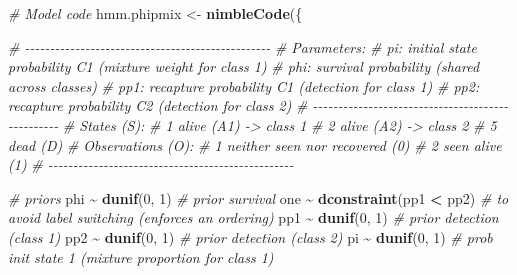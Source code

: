 \documentclass[
  12pt,
]{krantz}
\newenvironment{Shaded}{\begin{snugshade}}{\end{snugshade}}
\newcommand{\CommentTok}[1]{\textcolor[rgb]{0.56,0.35,0.01}{\textit{#1}}}
\newcommand{\DecValTok}[1]{\textcolor[rgb]{0.00,0.00,0.81}{#1}}
\newcommand{\FunctionTok}[1]{\textcolor[rgb]{0.13,0.29,0.53}{\textbf{#1}}}
\newcommand{\NormalTok}[1]{#1}
\newcommand{\OtherTok}[1]{\textcolor[rgb]{0.56,0.35,0.01}{#1}}
\newcommand{\SpecialCharTok}[1]{\textcolor[rgb]{0.81,0.36,0.00}{\textbf{#1}}}
\begin{document}
\begin{Shaded}
\begin{Highlighting}[]
\CommentTok{\# Model code}
\NormalTok{hmm.phipmix }\OtherTok{\textless{}{-}} \FunctionTok{nimbleCode}\NormalTok{(\{}
  
  \CommentTok{\# {-}{-}{-}{-}{-}{-}{-}{-}{-}{-}{-}{-}{-}{-}{-}{-}{-}{-}{-}{-}{-}{-}{-}{-}{-}{-}{-}{-}{-}{-}{-}{-}{-}{-}{-}{-}{-}{-}{-}{-}{-}{-}{-}{-}{-}{-}{-}{-}{-}}
  \CommentTok{\# Parameters:}
  \CommentTok{\# pi: initial state probability C1   (mixture weight for class 1)}
  \CommentTok{\# phi: survival probability          (shared across classes)}
  \CommentTok{\# pp1: recapture probability C1      (detection for class 1)}
  \CommentTok{\# pp2: recapture probability C2      (detection for class 2)}
  \CommentTok{\# {-}{-}{-}{-}{-}{-}{-}{-}{-}{-}{-}{-}{-}{-}{-}{-}{-}{-}{-}{-}{-}{-}{-}{-}{-}{-}{-}{-}{-}{-}{-}{-}{-}{-}{-}{-}{-}{-}{-}{-}{-}{-}{-}{-}{-}{-}{-}{-}{-}}
  \CommentTok{\# States (S):}
  \CommentTok{\# 1 alive (A1)  {-}\textgreater{} class 1}
  \CommentTok{\# 2 alive (A2)  {-}\textgreater{} class 2}
  \CommentTok{\# 5 dead (D)}
  \CommentTok{\# Observations (O):}
  \CommentTok{\# 1 neither seen nor recovered (0)}
  \CommentTok{\# 2 seen alive (1)}
  \CommentTok{\# {-}{-}{-}{-}{-}{-}{-}{-}{-}{-}{-}{-}{-}{-}{-}{-}{-}{-}{-}{-}{-}{-}{-}{-}{-}{-}{-}{-}{-}{-}{-}{-}{-}{-}{-}{-}{-}{-}{-}{-}{-}{-}{-}{-}{-}{-}{-}{-}{-}}
  
  \CommentTok{\# priors}
\NormalTok{  phi }\SpecialCharTok{\textasciitilde{}} \FunctionTok{dunif}\NormalTok{(}\DecValTok{0}\NormalTok{, }\DecValTok{1}\NormalTok{) }\CommentTok{\# prior survival}
\NormalTok{  one }\SpecialCharTok{\textasciitilde{}} \FunctionTok{dconstraint}\NormalTok{(pp1 }\SpecialCharTok{\textless{}}\NormalTok{ pp2) }\CommentTok{\# to avoid label switching (enforces an ordering)}
\NormalTok{  pp1 }\SpecialCharTok{\textasciitilde{}} \FunctionTok{dunif}\NormalTok{(}\DecValTok{0}\NormalTok{, }\DecValTok{1}\NormalTok{) }\CommentTok{\# prior detection (class 1)}
\NormalTok{  pp2 }\SpecialCharTok{\textasciitilde{}} \FunctionTok{dunif}\NormalTok{(}\DecValTok{0}\NormalTok{, }\DecValTok{1}\NormalTok{) }\CommentTok{\# prior detection (class 2)}
\NormalTok{  pi }\SpecialCharTok{\textasciitilde{}} \FunctionTok{dunif}\NormalTok{(}\DecValTok{0}\NormalTok{, }\DecValTok{1}\NormalTok{)  }\CommentTok{\# prob init state 1 (mixture proportion for class 1)}
  

\end{Highlighting}
\end{Shaded}
\end{document}
